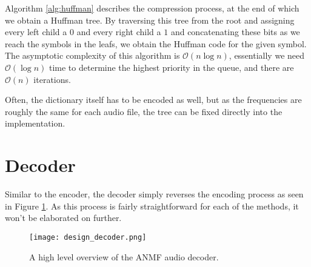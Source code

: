 Algorithm \ref{alg:huffman} describes the compression process, at the end of which we obtain a Huffman tree. By traversing this tree from the root and assigning every left child a $0$ and every right child a $1$ and concatenating these bits as we reach the symbols in the leafs, we obtain the Huffman code for the given symbol. The asymptotic complexity of this algorithm is $\mathcal{O}(n \log n)$, essentially we need $\mathcal{O}(\log n)$ time to determine the highest priority in the queue, and there are $\mathcal{O}(n)$ iterations.

Often, the dictionary itself has to be encoded as well, but as the frequencies are roughly the same for each audio file, the tree can be fixed directly into the implementation.

\section{Decoder}
Similar to the encoder, the decoder simply reverses the encoding process as seen in Figure \ref{fig:design_decoder}. As this process is fairly straightforward for each of the methods, it won't be elaborated on further.

\begin{figure}[ht]
	\caption[Decoder overview]{A high level overview of the ANMF audio decoder.}
	\label{fig:design_decoder}
	\centering
	\texttt{[image: design\_decoder.png]}
\end{figure}
